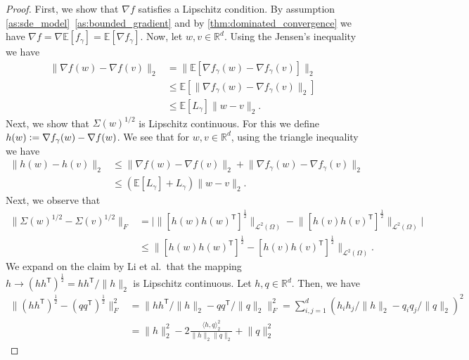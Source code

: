 \documentclass[12pt]{article}
\theoremstyle{definition}
\numberwithin{equation}{section}
\newcommand{\R}{\mathbb{R}}
\newcommand{\CL}{\mathcal{L}}
\newcommand{\T}{\mathsf{T}}
\newcommand{\ev}[1]{\mathbb{E}\left[{#1}\right]}
\newcommand{\norm}[1]{\lVert{#1}\rVert_2}
\newcommand{\normf}[1]{\lVert{#1}\rVert_F}
\newcommand{\norml}[1]{\lVert{#1}\rVert_{\CL^2(\Omega)}}
\newcommand{\scp}[2]{\langle{#1}, {#2}\rangle_2}
\newcommand{\defeq}{\vcentcolon=}
\begin{document}
\begin{proof}
  First, we show that $\nabla f$ satisfies a Lipschitz condition. By assumption \autoref{as:sde_model}~\ref{as:bounded_gradient} and by \autoref{thm:dominated_convergence} we have $\nabla f = \nabla \ev{f_\gamma} = \ev{\nabla f_\gamma}$. Now, let $w,v \in \R^d$. Using the Jensen's inequality we have
  \begin{align*}
    \norm{\nabla f(w) - \nabla f(v)} &= \norm{\ev{\nabla f_{\gamma}(w) - \nabla f_{\gamma}(v)}} \\
    &\leq \ev{\norm{\nabla f_{\gamma}(w) - \nabla f_{\gamma}(v)}} \\
    &\leq \ev{L_{\gamma}}\norm{w-v}.
  \end{align*}
  Next, we show that $\Sigma(w)^{1/2}$ is Lipschitz continuous. For this we define $h(w) \defeq \nabla f_{\gamma}(w) - \nabla f(w)$. We see that for $w,v \in \R^d$, using the triangle inequality we have
  \begin{equation}
    \label{eq:u_lipschitz}
    \begin{split}
      \norm{h(w) - h(v)} &\leq \norm{\nabla f(w) - \nabla f(v)} + \norm{\nabla f_{\gamma}(w) - \nabla f_{\gamma}(v)} \\
      &\leq \left(\ev{L_{\gamma}} + L_{\gamma}\right)\norm{w-v}.  
    \end{split}
  \end{equation}
  Next, we observe that
  \begin{equation}
    \label{eq:sigma_inequality}
    \begin{split}
      \normf{\Sigma(w)^{1/2} - \Sigma(v)^{1/2}} &= \lvert \norml{[h(w)h(w)^\T]^{\frac{1}{2}}} - \norml{[h(v)h(v)^\T]^{\frac{1}{2}}} \rvert \\
      &\leq \norml{[h(w)h(w)^\T]^{\frac{1}{2}} - [h(v)h(v)^\T]^{\frac{1}{2}}}.
    \end{split}
  \end{equation}
  We expand on the claim by Li et al.\ that the mapping $h \rightarrow (hh^\T)^{\frac{1}{2}} = hh^\T/\norm{h}$ is Lipschitz continuous. Let $h,q \in \R^d$. Then, we have
  \begin{equation}
    \label{eq:mapping_lipschitz}
    \begin{split}
    \normf{(hh^\T)^{\frac{1}{2}} - (qq^\T)^{\frac{1}{2}}}^2 &= \normf{hh^\T/\norm{h} - qq^\T/\norm{q}}^2 = \sum_{i,j = 1}^d (h_ih_j/\norm{h} - q_iq_j/\norm{q})^2 \\
    &= \norm{h}^2 - 2 \frac{\scp{h}{q}^2}{\norm{h}\norm{q}} + \norm{q}^2 

\end{split}
\end{equation}
\end{proof}
\end{document}
